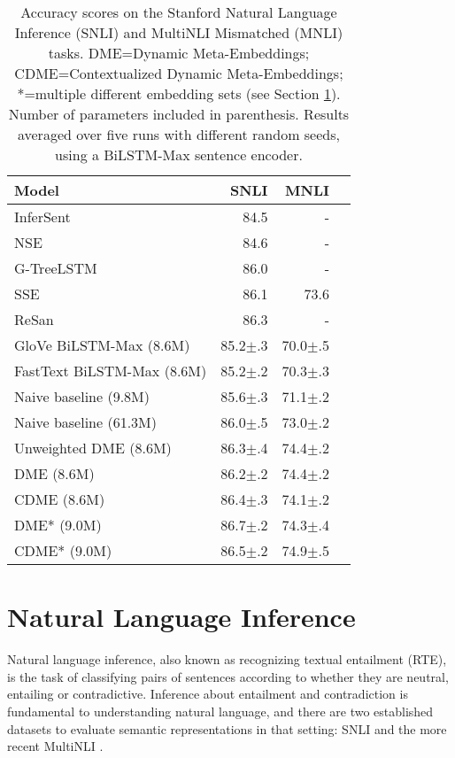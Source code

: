 \documentclass[11pt,a4paper]{article}
\begin{document}
\begin{table}[t]
  \centering
  \small
  \begin{tabular}{lrrr}
    \toprule
    Model & {\small SNLI} & {\small MNLI}\\
    \midrule
    {\small InferSent \cite{Conneau:2017emnlp}} & 84.5 & -\\
    {\small NSE \cite{Munkhdalai:2017acl}} & 84.6 & -\\
    {\small G-TreeLSTM \cite{Choi:2017arxiv}} & 86.0 & -\\
    {\small SSE \cite{Nie:2017arxiv}} & 86.1 & 73.6\\
    {\small ReSan \cite{Shen:2018arxiv}} & 86.3 & -\\
    \midrule
    GloVe BiLSTM-Max {\small (8.6M)} & 85.2$\pm$.3 & 70.0$\pm$.5\\
    FastText BiLSTM-Max {\small (8.6M)} & 85.2$\pm$.2 & 70.3$\pm$.3\\
    Naive baseline {\small (9.8M)} & 85.6$\pm$.3 & 71.1$\pm$.2\\
	Naive baseline {\small (61.3M)} & 86.0$\pm$.5 & 73.0$\pm$.2\\\midrule
    Unweighted DME {\small (8.6M)} & 86.3$\pm$.4 & 74.4$\pm$.2\\
    DME {\small (8.6M)} & 86.2$\pm$.2 & 74.4$\pm$.2\\
CDME {\small (8.6M)} & 86.4$\pm$.3 & 74.1$\pm$.2\\\midrule
DME* {\small (9.0M)} & 86.7$\pm$.2 & 74.3$\pm$.4\\
	CDME* {\small (9.0M)} & 86.5$\pm$.2 & 74.9$\pm$.5\\
\bottomrule
  \end{tabular}
  \caption{\label{table:nli}Accuracy scores on the Stanford Natural Language Inference (SNLI) and MultiNLI Mismatched (MNLI) tasks. DME=Dynamic Meta-Embeddings; CDME=Contextualized Dynamic Meta-Embeddings;  *=multiple different embedding sets (see Section \ref{sec:nli}). Number of parameters included in parenthesis. Results averaged over five runs with different random seeds, using a BiLSTM-Max sentence encoder.}
\end{table}

\section{Natural Language Inference}
\label{sec:nli}

Natural language inference, also known as recognizing textual entailment (RTE), is the task of classifying pairs of sentences according to whether they are neutral, entailing or contradictive. Inference about entailment and contradiction is fundamental to understanding natural language, and there are two established datasets to evaluate semantic representations in that setting: SNLI \cite{Bowman:2015emnlp} and the more recent MultiNLI \cite{Williams:2017arxiv}.
\end{document}
